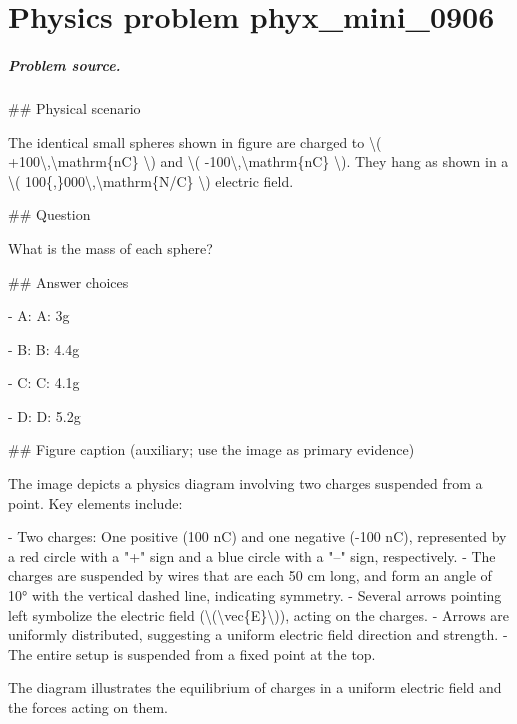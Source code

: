 
\chapter{Physics problem phyx\_mini\_0906}
\label{ch:PhyXMiniProblems_problem_phyx_mini_0906}

\paragraph{Problem source.}
\#\# Physical scenario

The identical small spheres shown in figure are charged to \textbackslash{}( +100\textbackslash{},\textbackslash{}mathrm\{nC\} \textbackslash{}) and \textbackslash{}( -100\textbackslash{},\textbackslash{}mathrm\{nC\} \textbackslash{}). They hang as shown in a \textbackslash{}( 100\{,\}000\textbackslash{},\textbackslash{}mathrm\{N/C\} \textbackslash{}) electric field.

\#\# Question

What is the mass of each sphere?

\#\# Answer choices

- A: A: 3g

- B: B: 4.4g

- C: C: 4.1g

- D: D: 5.2g

\#\# Figure caption (auxiliary; use the image as primary evidence)

The image depicts a physics diagram involving two charges suspended from a point. Key elements include:

- Two charges: One positive (100 nC) and one negative (-100 nC), represented by a red circle with a "+" sign and a blue circle with a "–" sign, respectively.
- The charges are suspended by wires that are each 50 cm long, and form an angle of 10° with the vertical dashed line, indicating symmetry.
- Several arrows pointing left symbolize the electric field (\textbackslash{}(\textbackslash{}vec\{E\}\textbackslash{})), acting on the charges.
- Arrows are uniformly distributed, suggesting a uniform electric field direction and strength.
- The entire setup is suspended from a fixed point at the top.

The diagram illustrates the equilibrium of charges in a uniform electric field and the forces acting on them.


